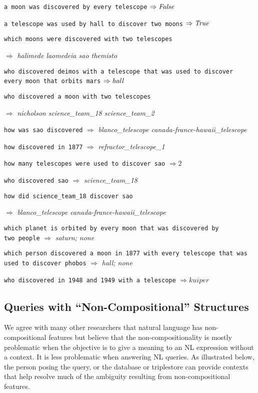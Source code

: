 \documentclass[../main.tex]{subfiles}
\begin{document}
\begin{refsection}
\noindent \texttt{a moon was discovered by every telescope} $\Rightarrow \mathit{False}$

\noindent \texttt{a telescope was used by hall to discover two moons} $\Rightarrow \mathit{True}$

\noindent \texttt{which moons were discovered with two telescopes}

$\Rightarrow$ \textit{halimede laomedeia sao themisto}

\noindent \texttt{who discovered deimos with a telescope that was used to discover \\ every moon that orbits mars} $\Rightarrow \mathit{hall}$

\noindent \texttt{who discovered a moon with two telescopes}

$\Rightarrow$ \textit{nicholson science\_team\_18 science\_team\_2}

\noindent \texttt{how was sao discovered} $\Rightarrow$ \textit{blanco\_telescope canada-france-hawaii\_telescope}

\noindent \texttt{how discovered in 1877} $\Rightarrow$ \textit{refractor\_telescope\_1}

\noindent \texttt{how many telescopes were used to discover sao} $\Rightarrow 2$

\noindent \texttt{who discovered sao}  $\Rightarrow$ \textit{science\_team\_18}

\noindent \texttt{how did science\_team\_18 discover sao}

$\Rightarrow$ \textit{blanco\_telescope canada-france-hawaii\_telescope}

\noindent \texttt{which planet is orbited by every moon that was discovered by \\ two people}
$\Rightarrow$ \textit{saturn; none}

\noindent \texttt{which person discovered a moon in 1877 with every telescope that was used to discover phobos} $\Rightarrow$ \textit{hall; none}

\noindent \texttt{who discovered in 1948 and 1949 with a telescope} $\Rightarrow \mathit{kuiper}$

\subsection{Queries with ``Non-Compositional'' Structures}
\label{webist2019conf:noncompositional}

We agree with many other researchers that natural language has non-compositional features but believe that the non-compositionality is mostly problematic when the objective is to give a meaning to an NL expression without a context. It is less problematic when answering NL queries. As illustrated below, the person posing the query, or the database or triplestore can provide contexts that help resolve much of the ambiguity resulting from non-compositional features.


\end{refsection}
\end{document}
